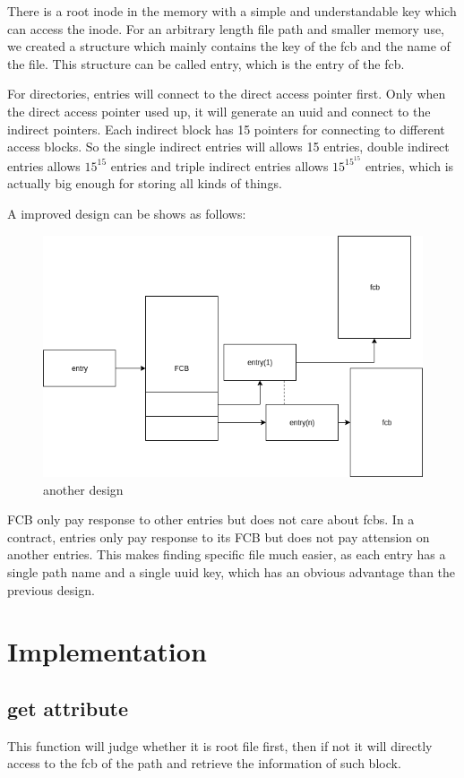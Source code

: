 \documentclass[legalpaper]{article}
\begin{document}
	There is a root inode in the memory with a simple and understandable key which can access the inode. For an arbitrary length file path and smaller memory use, we created a structure which mainly contains the key of the fcb and the name of the file.  This structure can be called entry, which is the entry of the fcb.\par
	For directories, entries will connect to the direct access pointer first. Only when the direct access pointer used up, it will generate an uuid and connect to the indirect pointers. Each indirect block has 15 pointers for connecting to different access blocks. So the single indirect entries will allows 15 entries, double indirect entries allows $15^{15}$ entries and triple indirect entries allows $15^{15^{15}}$ entries, which is actually big enough for storing all kinds of things.\par
	A improved design can be shows as follows:\par
	\begin{figure}[h!]
	\centering
	\includegraphics[width = \textwidth]{addnode}
	\caption{another design}
	\end{figure}
	FCB only pay response to other entries but does not care about fcbs. In a contract, entries only pay response to its FCB but does not pay attension on another entries. This makes finding specific file much easier, as each entry has a single path name and a single uuid key, which has an obvious advantage than the previous design.
	\section{Implementation}
	\subsection*{get attribute}
	This function will judge whether it is root file first, then if not it will directly access to the fcb of the path and retrieve the information of such block. 
\end{document}

